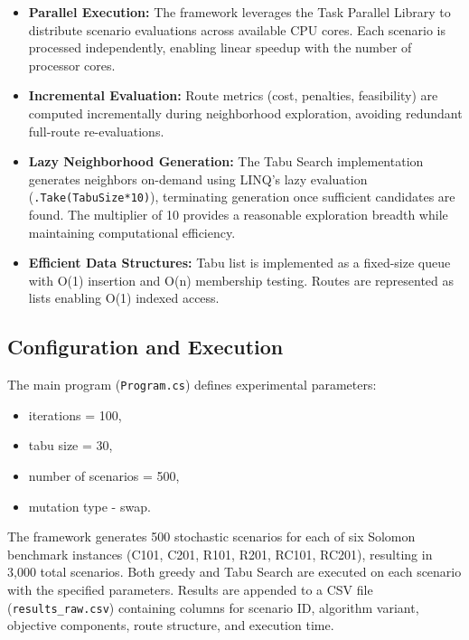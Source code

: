 \begin{itemize}
    \item \textbf{Parallel Execution:} The framework leverages the Task Parallel Library to distribute scenario evaluations across available CPU cores. Each scenario is processed independently, enabling linear speedup with the number of processor cores.
    
    \item \textbf{Incremental Evaluation:} Route metrics (cost, penalties, feasibility) are computed incrementally during neighborhood exploration, avoiding redundant full-route re-evaluations.
    
    \item \textbf{Lazy Neighborhood Generation:} The Tabu Search implementation generates neighbors on-demand using LINQ's lazy evaluation (\texttt{.Take(TabuSize*10)}), terminating generation once sufficient candidates are found. The multiplier of 10 provides a reasonable exploration breadth while maintaining computational efficiency.
    
    \item \textbf{Efficient Data Structures:} Tabu list is implemented as a fixed-size queue with O(1) insertion and O(n) membership testing. Routes are represented as lists enabling O(1) indexed access.
\end{itemize}

\subsection{Configuration and Execution}

The main program (\texttt{Program.cs}) defines experimental parameters:
\begin{itemize}
    \item iterations = 100,
    \item tabu size = 30,
    \item number of scenarios = 500,
    \item mutation type - swap.
\end{itemize}

The framework generates 500 stochastic scenarios for each of six Solomon benchmark instances (C101, C201, R101, R201, RC101, RC201), resulting in 3,000 total scenarios. Both greedy and Tabu Search are executed on each scenario with the specified parameters. Results are appended to a CSV file (\texttt{results\_raw.csv}) containing columns for scenario ID, algorithm variant, objective components, route structure, and execution time.

